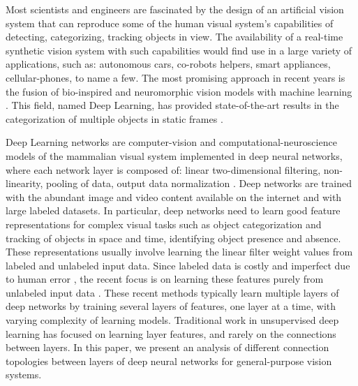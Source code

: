 \documentclass{article} %
\begin{document}
Most scientists and engineers are fascinated by the design of an artificial vision system that can reproduce some of the human visual system's capabilities of detecting, categorizing, tracking objects in view. 
The availability of a real-time synthetic vision system with such capabilities would find use in a large 
variety of applications, such as: autonomous cars, co-robots helpers, smart appliances, cellular-phones, to name a few. 
The most promising approach in recent years is the fusion of bio-inspired and neuromorphic vision models with machine learning 
\cite{lecun_gradient-based_1998,hadsell_dimensionality_2006,gregor_structured_2011,riesenhuber_hierarchical_1999,serre_feedforward_2007,serre_neuromorphic_2010,jarrett_what_2009,lecun_convolutional_2010,boureau_theoretical_2010}.
This field, named Deep Learning, has provided state-of-the-art results in the categorization 
of multiple objects in static frames \cite{krizhevsky_imagenet_2012}.

Deep Learning networks are computer-vision and computational-neuroscience models of the mammalian visual 
system implemented in deep neural networks, where each network layer is composed of: linear two-dimensional filtering, 
non-linearity, pooling of data, output data normalization \cite{jarrett_what_2009,lecun_convolutional_2010,boureau_theoretical_2010}. 
Deep networks are trained with the abundant image and video content available on the internet and with large labeled datasets. 
In particular, deep networks need to learn good feature representations for complex visual tasks such as object categorization and 
tracking of objects in space and time, identifying object presence and absence.
These representations usually involve learning the linear filter weight values from labeled and unlabeled input data.
Since labeled data is costly and imperfect due to human error 
\cite{karpathy_lessons_2011, torralba_unbiased_2011, hou_meta-theory_2012}, the recent focus is on learning these features purely 
from unlabeled input data \cite{olshausen_emergence_1996, hyvarinen_independent_2000, hinton_fast_2006, vincent_extracting_2008, coates_analysis_2011}.
These recent methods typically learn multiple layers of deep networks by training several layers of features, one layer at a time, with varying complexity of learning models.
Traditional work in unsupervised deep learning has focused on learning layer features, and rarely on the connections between layers.
In this paper, we present an analysis of different connection topologies between layers of deep neural networks for general-purpose vision systems. 
\end{document}
